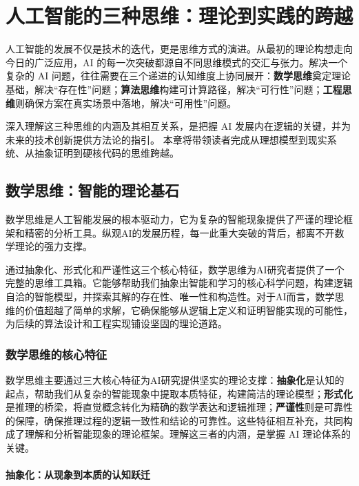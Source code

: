\chapter{人工智能的三种思维：理论到实践的跨越}

人工智能的发展不仅是技术的迭代，更是思维方式的演进。从最初的理论构想走向今日的广泛应用，AI 的每一次突破都源自不同思维模式的交汇与张力。解决一个复杂的 AI 问题，往往需要在三个递进的认知维度上协同展开：\textbf{数学思维}奠定理论基础，解决“存在性”问题；\textbf{算法思维}构建可计算路径，解决“可行性”问题；\textbf{工程思维}则确保方案在真实场景中落地，解决“可用性”问题。

深入理解这三种思维的内涵及其相互关系，是把握 AI 发展内在逻辑的关键，并为未来的技术创新提供方法论的指引。
本章将带领读者完成从理想模型到现实系统、从抽象证明到硬核代码的思维跨越。

\section{数学思维：智能的理论基石}

数学思维是人工智能发展的根本驱动力，它为复杂的智能现象提供了严谨的理论框架和精密的分析工具。纵观AI的发展历程，每一此重大突破的背后，都离不开数学理论的强力支撑。

通过抽象化、形式化和严谨性这三个核心特征，数学思维为AI研究者提供了一个完整的思维工具箱。它能够帮助我们抽象出智能和学习的核心科学问题，构建逻辑自洽的智能模型，并探索其解的存在性、唯一性和构造性。对于AI而言，数学思维的价值超越了简单的求解，它确保能够从逻辑上定义和证明智能实现的可能性，为后续的算法设计和工程实现铺设坚固的理论道路。

\subsection{数学思维的核心特征}

数学思维主要通过三大核心特征为AI研究提供坚实的理论支撑：\textbf{抽象化}是认知的起点，帮助我们从复杂的智能现象中提取本质特征，构建简洁的理论模型；\textbf{形式化}是推理的桥梁，将直觉概念转化为精确的数学表达和逻辑推理；\textbf{严谨性}则是可靠性的保障，确保推理过程的逻辑一致性和结论的可靠性。这些特征相互补充，共同构成了理解和分析智能现象的理论框架。理解这三者的内涵，是掌握 AI 理论体系的关键。

\subsubsection{抽象化：从现象到本质的认知跃迁}

